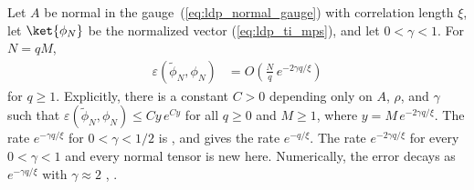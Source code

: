 \begin{lemma}
    \label{thm:ldp_approximation_error_normal}
    \leanok
    Let $A$ be normal in the gauge~(\ref{eq:ldp_normal_gauge}) with correlation
    length $\xi$, let $\ket{\phi_N}$ be the
    normalized vector (\ref{eq:ldp_ti_mps}), and let $0<\gamma<1$. For
    $N=qM$,
    \begin{align}
        \varepsilon(\widetilde\phi_N,\phi_N)
         & =O\!\left(\frac Nq\,e^{-2\gamma q/\xi}\right)
        \label{eq:ldp_approximation_error_normal}
    \end{align}
    for $q\ge1$.
    Explicitly, there is a constant $C>0$ depending only on $A$, $\rho$, and $\gamma$
    such that $\varepsilon(\widetilde\phi_N,\phi_N)\le Cy\,e^{Cy}$ for all $q\ge0$
    and $M\ge1$, where $y=M\,e^{-2\gamma q/\xi}$.
    The rate $e^{-\gamma q/\xi}$ for $0<\gamma<1/2$ is
    \cite[Lemma~1, eq.~(17), and Lemma~1$'$(i)]{Malz2024Preparation}, and
    \cite[App.~B4, eqs.~(S52) and~(S53)]{Murota2026ExactLogDepth} gives the
    rate $e^{-q/\xi}$. The rate $e^{-2\gamma q/\xi}$ for every $0<\gamma<1$
    and every normal tensor is new here. Numerically, the error decays as
    $e^{-\gamma q/\xi}$ with $\gamma\approx2$
    \cite[Supplemental Material, discussion of Fig.~S1]{Malz2024Preparation},
    \cite[eq.~(4)]{Wei2026ParallelSequential}.
\end{lemma}
